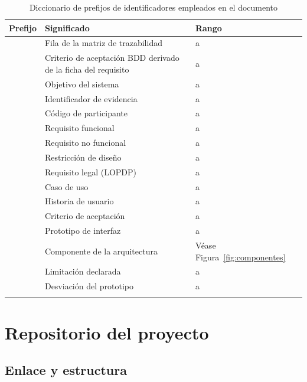 \begin{longtable}{|C{2.2cm}|L{5.2cm}|L{7.0cm}|}
\hline
{}\textbf{Prefijo} & \textbf{Significado} & \textbf{Rango} \\
\hline
\endhead
{} & Fila de la matriz de trazabilidad &  a  \\ \hline
{} & Criterio de aceptación BDD derivado de la ficha del requisito &  a  \\ \hline
{} & Objetivo del sistema &  a  \\ \hline
{} & Identificador de evidencia &  a  \\ \hline
{} & Código de participante &  a  \\ \hline
{} & Requisito funcional &  a  \\ \hline
{} & Requisito no funcional &  a  \\ \hline
{} & Restricción de diseño &  a  \\ \hline
{} & Requisito legal (LOPDP) &  a  \\ \hline
{} & Caso de uso &  a  \\ \hline
{} & Historia de usuario &  a  \\ \hline
{} & Criterio de aceptación &  a  \\ \hline
{} & Prototipo de interfaz &  a  \\ \hline
{} & Componente de la arquitectura & Véase Figura~\ref{fig:componentes} \\ \hline
{} & Limitación declarada &  a  \\ \hline
{} & Desviación del prototipo &  a  \\ \hline
\caption{Diccionario de prefijos de identificadores empleados en el documento}
\end{longtable}

\newpage
\section{Repositorio del proyecto}

\subsection{Enlace y estructura}

